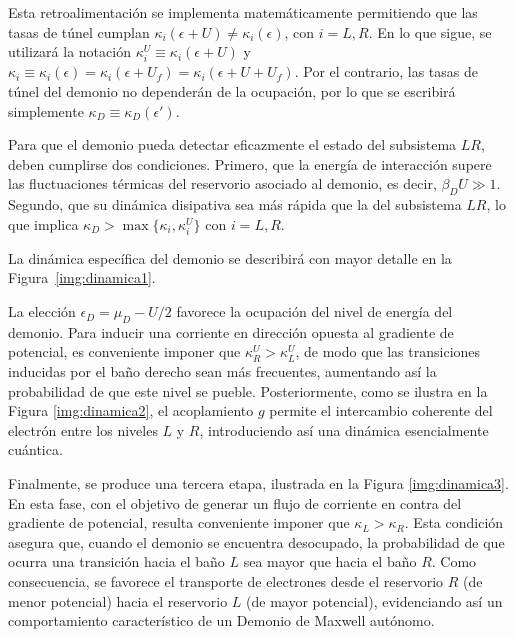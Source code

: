 Esta retroalimentación se implementa matemáticamente permitiendo que las tasas de túnel cumplan $\kappa_{i}(\epsilon + U) \neq \kappa_{i}(\epsilon)$, con $i = L, R$. En lo que sigue, se utilizará la notación $\kappa^{U}_{i} \equiv \kappa_{i}(\epsilon+U)$ y $\kappa_{i} \equiv \kappa_{i}(\epsilon)=\kappa_{i}(\epsilon+U_{f})=\kappa_{i}(\epsilon+U+U_{f})$. Por el contrario, las tasas de túnel del demonio no dependerán de la ocupación, por lo que se escribirá simplemente $\kappa_{D}\equiv \kappa_{D}(\epsilon')$.

Para que el demonio pueda detectar eficazmente el estado del subsistema $LR$, deben cumplirse dos condiciones. Primero, que la energía de interacción supere las fluctuaciones térmicas del reservorio asociado al demonio, es decir, $\beta_{D} U \gg 1$. Segundo, que su dinámica disipativa sea más rápida que la del subsistema $LR$, lo que implica $\kappa_{D} > \max\{\kappa_{i}, \kappa^{U}_{i}\}$ con $i = L, R$.

La dinámica específica del demonio se describirá con mayor detalle en la Figura~\ref{img:dinamica1}.


La elección $\epsilon_D = \mu_D - U/2$ favorece la ocupación del nivel de energía del demonio. Para inducir una corriente en dirección opuesta al gradiente de potencial, es conveniente imponer que $\kappa^{U}_{R} > \kappa^{U}_{L}$, de modo que las transiciones inducidas por el baño derecho sean más frecuentes, aumentando así la probabilidad de que este nivel se pueble. Posteriormente, como se ilustra en la Figura \ref{img:dinamica2}, el acoplamiento $g$ permite el intercambio coherente del electrón entre los niveles $L$ y $R$, introduciendo así una dinámica esencialmente cuántica.



Finalmente, se produce una tercera etapa, ilustrada en la Figura \ref{img:dinamica3}. En esta fase, con el objetivo de generar un flujo de corriente en contra del gradiente de potencial, resulta conveniente imponer que $\kappa_{L} > \kappa_{R}$. Esta condición asegura que, cuando el demonio se encuentra desocupado, la probabilidad de que ocurra una transición hacia el baño $L$ sea mayor que hacia el baño $R$. Como consecuencia, se favorece el transporte de electrones desde el reservorio $R$ (de menor potencial) hacia el reservorio $L$ (de mayor potencial), evidenciando así un comportamiento característico de un Demonio de Maxwell autónomo.

